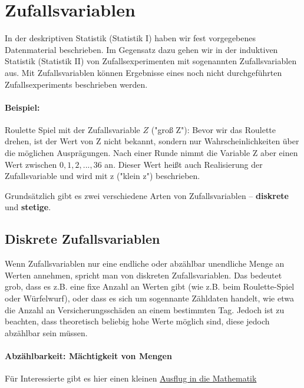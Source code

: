 \documentclass[a4paper]{article}
\begin{document}
\clearpage


\section{Zufallsvariablen}\label{chap:zv}

In der deskriptiven Statistik (Statistik I) haben wir fest vorgegebenes Datenmaterial beschrieben. Im Gegensatz dazu gehen wir in der induktiven Statistik (Statistik II) von Zufallsexperimenten mit sogenannten Zufallsvariablen aus. Mit Zufallsvariablen können Ergebnisse eines noch nicht durchgeführten Zufallsexperiments beschrieben werden.

\paragraph{Beispiel:} Roulette Spiel mit der Zufallsvariable $Z$ ("groß Z"): Bevor wir das Roulette drehen, ist der Wert von Z nicht bekannt, sondern nur Wahrscheinlichkeiten über die möglichen Ausprägungen. Nach einer Runde nimmt die Variable Z aber einen Wert zwischen $0,1,2,...,36$ an. Dieser Wert heißt auch Realisierung der Zufallsvariable und wird mit z ("klein z") beschrieben.

\noindent Grundsätzlich gibt es zwei verschiedene Arten von Zufallsvariablen -- \textbf{diskrete} und \textbf{stetige}. 

\subsection{Diskrete Zufallsvariablen} \label{sec:dzv}
Wenn Zufallsvariablen nur eine endliche oder abzählbar unendliche Menge an Werten annehmen, spricht man von diskreten Zufallsvariablen. Das bedeutet grob, dass es z.B. eine fixe Anzahl an Werten gibt (wie z.B. beim Roulette-Spiel oder Würfelwurf), oder dass es sich um sogennante Zähldaten handelt, wie etwa die Anzahl an Versicherungsschäden an einem bestimmten Tag. Jedoch ist zu beachten, dass theoretisch beliebig hohe Werte möglich sind, diese jedoch abzählbar sein müssen. 

\paragraph{Abzählbarkeit: Mächtigkeit von Mengen} Für Interessierte gibt es hier einen kleinen  \href{https://de.wikibooks.org/wiki/Mathe_f\%C3\%BCr_Nicht-Freaks:_M\%C3\%A4chtigkeit_von_Mengen}{Ausflug in die Mathematik}
\end{document}
